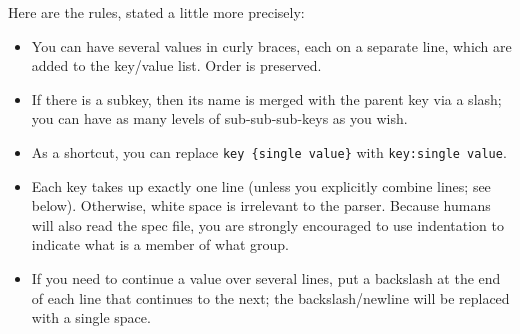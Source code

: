\documentclass{article}
\begin{document}
Here are the rules, stated a little more precisely:
\begin{itemize}
\item You can have several values in curly braces, each on a separate line, which are added to the key/value list. Order is preserved.
\item If there is a subkey, then its name is merged with the parent key via a slash;
you can have as many levels of sub-sub-sub-keys as you wish. 
\item As a shortcut, you can replace {\tt key \{single value\}} with {\tt key:single value}. 
\item Each key takes up exactly one line (unless you explicitly combine lines; see below). Otherwise, white
space is irrelevant to the parser. Because humans will also read the spec file, you
are strongly encouraged to use indentation to indicate what is a member of what group.
\item If you need to continue a value over several lines, put a backslash at the end of
each line that continues to the next; the backslash/newline will be replaced with a single space.
\end{itemize}
\end{document}
